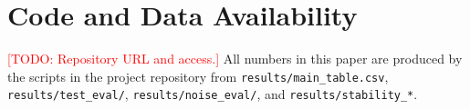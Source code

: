 \documentclass[conference]{IEEEtran}
\newcommand{\TODO}[1]{\textcolor{red}{[TODO: #1]}}
\begin{document}
\section*{Code and Data Availability}
\TODO{Repository URL and access.} All numbers in this paper are produced by the scripts in the
project repository from \texttt{results/main\_table.csv}, \texttt{results/test\_eval/},
\texttt{results/noise\_eval/}, and \texttt{results/stability\_*}.



\end{document}
